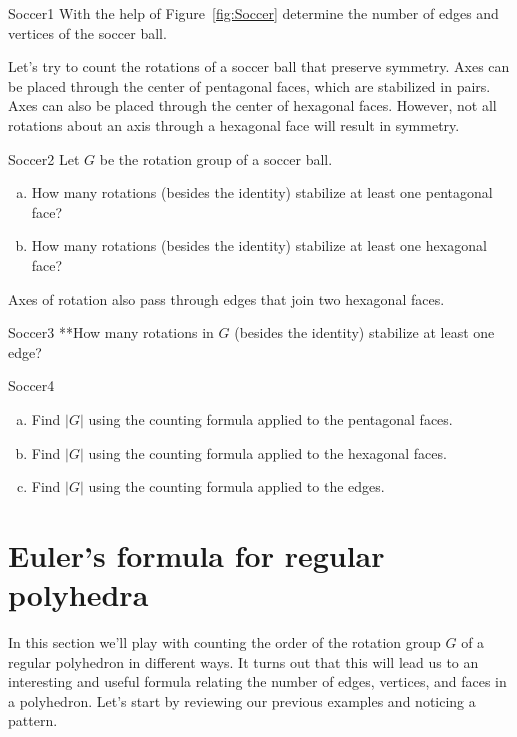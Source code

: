\begin{exercise}{Soccer1}
With the help of Figure~\ref{fig:Soccer} determine the number of edges and vertices of the soccer ball. 
\end {exercise}

Let's try to count the rotations of a soccer ball that preserve symmetry.  Axes can be placed through the center of pentagonal faces, which are stabilized in pairs.  Axes can also be placed through the center of hexagonal faces.  However, not all rotations about an axis through a hexagonal face will result in symmetry.

\begin {exercise}{Soccer2}
Let $G$ be the rotation group of a soccer ball. 
\begin{enumerate}[(a)]
\item How many rotations (besides the identity) stabilize at least one pentagonal face? 
\item How many rotations (besides the identity) stabilize at least one hexagonal face?
\end{enumerate}
\end {exercise}

Axes of rotation also pass through edges that join two hexagonal faces. 

\begin{exercise}{Soccer3}
**How many rotations in $G$ (besides the identity) stabilize at least one edge?
\end {exercise}

\begin{exercise}{Soccer4}
\begin{enumerate}[(a)]
\item Find $|G|$ using the counting formula applied to the pentagonal faces.
\item Find $|G|$ using the counting formula applied to the hexagonal faces.
\item Find $|G|$ using the counting formula applied to the edges.
\end{enumerate}
\end{exercise}

\section{Euler's formula for regular polyhedra}
In this section we'll play with counting the order of the rotation group $G$ of a regular polyhedron in different ways. It turns out that this will lead us to an interesting and useful formula relating the number of edges, vertices, and faces in a polyhedron.
Let's start by reviewing our previous examples and noticing a pattern.

